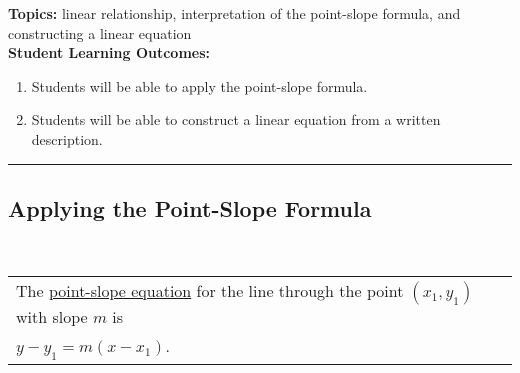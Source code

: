 

\noindent \textbf{Topics:}  linear relationship, interpretation of the point-slope formula, and constructing a linear equation\\

\noindent \textbf{Student Learning Outcomes:}
\begin{enumerate}
\item Students will be able to apply the point-slope formula.
\item Students will be able to construct a linear equation from a written description.

\end{enumerate}

\hrule 

\bigskip

\subsection{Applying the Point-Slope Formula} ~

\begin{tabular}{| l |}\hline
The \underline{point-slope equation} for the line through the point $(x_1,y_1)$ with slope $m$ is \\

 $y-y_1 = m(x-x_1)$. \\ \hline
\end{tabular} 

